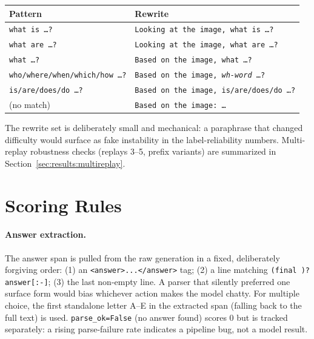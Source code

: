 \documentclass[10pt]{article}
\begin{document}
\begin{center}
\small
\begin{tabular}{ll}
\toprule
Pattern & Rewrite \\
\midrule
\texttt{what is \ldots?} & \texttt{Looking at the image, what is \ldots?} \\
\texttt{what are \ldots?} & \texttt{Looking at the image, what are \ldots?} \\
\texttt{what \ldots?} & \texttt{Based on the image, what \ldots?} \\
\texttt{who/where/when/which/how \ldots?} & \texttt{Based on the image, \emph{wh-word} \ldots?} \\
\texttt{is/are/does/do \ldots?} & \texttt{Based on the image, is/are/does/do \ldots?} \\
(no match) & \texttt{Based on the image: \ldots} \\
\bottomrule
\end{tabular}
\end{center}

The rewrite set is deliberately small and mechanical: a paraphrase that
changed difficulty would surface as fake instability in the label-reliability
numbers. Multi-replay robustness checks (replays 3--5, prefix variants) are
summarized in Section~\ref{sec:results:multireplay}.

\section{Scoring Rules}
\label{sec:scoring}

\paragraph{Answer extraction.}
The answer span is pulled from the raw generation in a fixed, deliberately
forgiving order: (1) an \verb|<answer>...</answer>| tag; (2) a line
matching \verb|(final )?answer[:-]|; (3) the last non-empty line. A parser
that silently preferred one surface form would bias whichever action makes
the model chatty. For multiple choice, the first standalone letter A--E in
the extracted span (falling back to the full text) is used.
\texttt{parse\_ok=False} (no answer found) scores 0 but is tracked
separately: a rising parse-failure rate indicates a pipeline bug, not a
model result.
\end{document}
